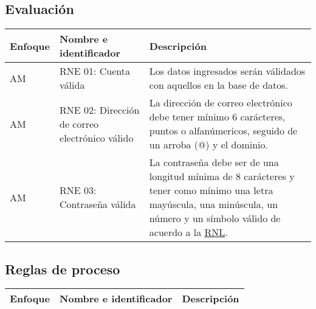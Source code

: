  \subsection{Evaluación}
   \begin{center}
   \begin{tabular}{|p{1.5cm}|p{4cm}|p{7cm}|}
     \hline
       \textbf{Enfoque}&\textbf{Nombre e identificador} & \textbf{Descripción} \\ \hline
       \label{rne_01} AM & RNE 01: Cuenta válida & Los datos ingresados serán válidados con aquellos en la base de datos. \\ \hline
       \label{rne_02} AM & RNE 02: Dirección de correo electrónico válido &  La dirección de correo electrónico debe tener mínimo 6 carácteres, puntos o alfanúmericos, seguido de un arroba (@) y el dominio. \\ \hline
       \label{rne_03} AM & RNE 03: Contraseña válida &  La contraseña debe ser de una longitud mínima de 8 carácteres y tener como mínimo una letra mayúscula, una minúscula, un número y un símbolo válido de acuerdo a la \hyperref[rnl_01]{RNL}. \\ \hline
   \end{tabular}
       \label{tab:rne}
 \end{center}
 
 \subsection{Reglas de proceso}
   \begin{center}
   \begin{tabular}{|p{1.5cm}|p{4cm}|p{7cm}|}
     \hline
       \textbf{Enfoque}&\textbf{Nombre e identificador} & \textbf{Descripción} \\ \hline
   \end{tabular}
       \label{tab:rnrp}
 \end{center}